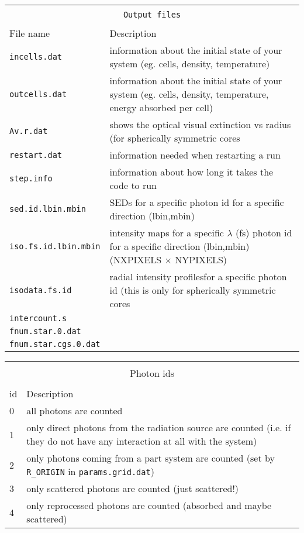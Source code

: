 \documentclass[12pt,a4paper]{article}
\begin{document}
\vspace{2cm}
{\centering 
\begin{tabular}{|p{4cm}|p{13.1cm}|}
\hline
\multicolumn{2}{|c|}{}\\ 
\multicolumn{2}{|c|}{\large\texttt{Output files}}\\
\multicolumn{2}{|c|}{}\\  
\hline
File name & Description \\
\hline
\texttt{incells.dat} &  information about the initial state of your system (eg. cells, density, temperature)\\
\texttt{outcells.dat} &   information about the initial state of your system (eg. cells, density, temperature, energy absorbed per cell)\\
\texttt{Av.r.dat} & shows the optical visual extinction vs radius (for spherically symmetric cores\\
\texttt{restart.dat} & information needed when restarting a run \\
\texttt{step.info} & information about how long it takes the code to run\\
\texttt{sed.id.lbin.mbin} & SEDs for a specific photon id for a specific direction (lbin,mbin)\\
\texttt{iso.fs.id.lbin.mbin} & intensity maps for a specific $\lambda$ (fs) photon id for a specific direction (lbin,mbin) (NXPIXELS $\times$ NYPIXELS) \\
\texttt{isodata.fs.id} & radial intensity profilesfor a specific photon id  (this is only for spherically symmetric cores \\
\texttt{intercount.s} & \\

\texttt{fnum.star.0.dat} & \\
\texttt{fnum.star.cgs.0.dat} & \\
\hline
\end{tabular}
\par}

\vspace{1cm}
{\centering 
\begin{tabular}{|p{1cm}|p{16.1cm}|}
\hline
\multicolumn{2}{|c|}{}\\ 
\multicolumn{2}{|c|}{\large Photon ids}\\
\multicolumn{2}{|c|}{}\\  
\hline
id & Description \\
\hline
0  & all photons are counted  \\
1  &  only direct photons  from the radiation source are  counted (i.e. if they do not have any interaction at all with the system)\\
2  &  only  photons  coming from a part system are counted (set by \texttt{R\_ORIGIN} in \texttt{params.grid.dat}) \\
3  & only scattered photons are counted (just scattered!) \\
4  & only reprocessed photons are counted (absorbed and maybe scattered) \\
\hline
\end{tabular}
\par}
\end{document}

